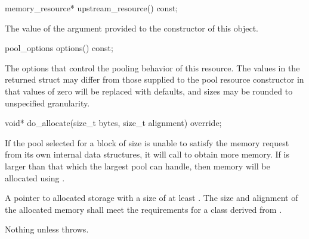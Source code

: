 %
%
\begin{itemdecl}
memory_resource* upstream_resource() const;
\end{itemdecl}

\begin{itemdescr}
\pnum
\returns
The value of the  argument
provided to the constructor of this object.
\end{itemdescr}

%
%
\begin{itemdecl}
pool_options options() const;
\end{itemdecl}

\begin{itemdescr}
\pnum
\returns
The options that control the pooling behavior of this resource.
The values in the returned struct may differ
from those supplied to the pool resource constructor in that
values of zero will be replaced with 
defaults, and sizes may be rounded to unspecified granularity.
\end{itemdescr}

%
%
\begin{itemdecl}
void* do_allocate(size_t bytes, size_t alignment) override;
\end{itemdecl}

\begin{itemdescr}
\pnum
\effects
If the pool selected for a block of size 
is unable to satisfy the memory request from its own internal data structures,
it will call  to obtain more memory.
If  is larger than that which the largest pool can handle,
then memory will be allocated using .

\pnum
\returns
A pointer to allocated storage
with a size of at least .
The size and alignment of the allocated memory shall meet the requirements
for a class derived from .

\pnum
\throws
Nothing unless  throws.
\end{itemdescr}

